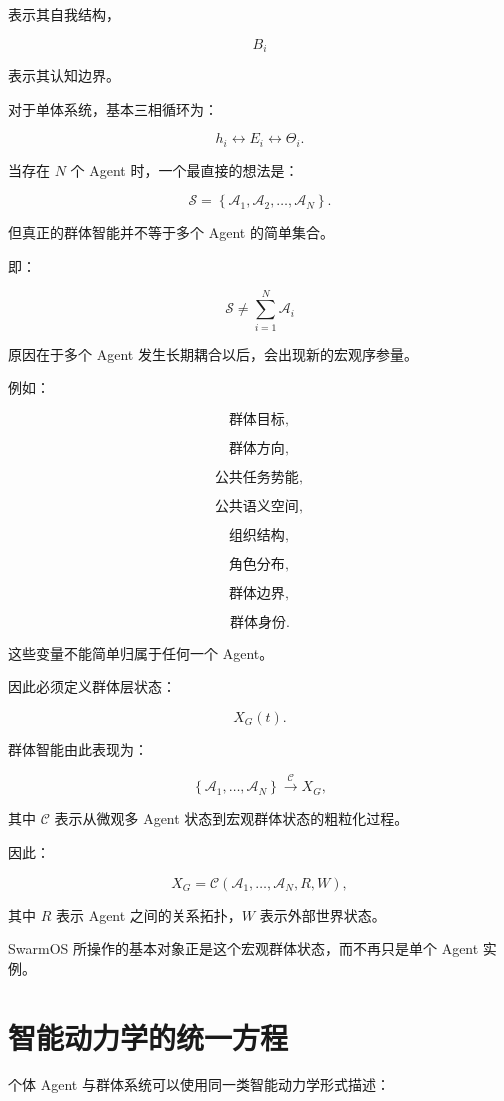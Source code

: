 表示其自我结构，

\[
B_i
\]

表示其认知边界。

对于单体系统，基本三相循环为：

\[
h_i
\leftrightarrow
E_i
\leftrightarrow
\Theta_i.
\]

当存在 $N$ 个 Agent 时，一个最直接的想法是：

\[
\mathcal{S}
=
\left\{
\mathcal{A}_1,
\mathcal{A}_2,
\ldots,
\mathcal{A}_N
\right\}.
\]

但真正的群体智能并不等于多个 Agent 的简单集合。

即：

\[
\boxed{
\mathcal{S}
\neq
\sum_{i=1}^{N}\mathcal{A}_i
}
\]

原因在于多个 Agent 发生长期耦合以后，会出现新的宏观序参量。

例如：

\[
\text{群体目标},
\]

\[
\text{群体方向},
\]

\[
\text{公共任务势能},
\]

\[
\text{公共语义空间},
\]

\[
\text{组织结构},
\]

\[
\text{角色分布},
\]

\[
\text{群体边界},
\]

\[
\text{群体身份}.
\]

这些变量不能简单归属于任何一个 Agent。

因此必须定义群体层状态：

\[
X_G(t).
\]

群体智能由此表现为：

\[
\left\{
\mathcal{A}_1,
\dots,
\mathcal{A}_N
\right\}
\xrightarrow{\mathcal{C}}
X_G,
\]

其中 $\mathcal{C}$ 表示从微观多 Agent 状态到宏观群体状态的粗粒化过程。

因此：

\[
X_G
=
\mathcal{C}
\left(
\mathcal{A}_1,
\dots,
\mathcal{A}_N,
R,
W
\right),
\]

其中 $R$ 表示 Agent 之间的关系拓扑，$W$ 表示外部世界状态。

SwarmOS 所操作的基本对象正是这个宏观群体状态，而不再只是单个 Agent 实例。


\section{智能动力学的统一方程}

个体 Agent 与群体系统可以使用同一类智能动力学形式描述：

